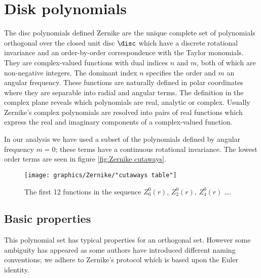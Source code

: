 \section{Disk polynomials}

The disc polynomials defined Zernike are the unique complete set of polynomials orthogonal over the closed unit disc $\disc$ which have a discrete rotational invariance and an order-by-order correspondence with the Taylor monomials. They are complex-valued functions with dual indices $n$ and $m$, both of which are non-negative integers. The dominant index $n$ specifies the order and $m$ an angular frequency. These functions are naturally defined in polar coordinates where they are separable into radial and angular terms. The definition in the complex plane reveals which polynomials are real, analytic or complex. Usually Zernike's complex polynomials are resolved into pairs of real functions which express the real and imaginary components of a complex-valued function.

In our analysis we have used a subset of the polynomials defined by angular frequency $m=0$; these terms have a continuous rotational invariance. The lowest order terms are seen in figure \eqref{fig:Zernike cutaways}.

\begin{figure}[htbp] %
   \centering
   \texttt{[image: graphics/Zernike/"cutaways table"]} 
   \caption{The first 12 functions in the sequence $Z_{0}^{0}(r)$, $Z_{2}^{0}(r)$, $Z_{4}^{0}(r)$ \dots .}
   \label{fig:Zernike cutaways}
\end{figure}

\subsection{Basic properties}
This polynomial set has typical properties for an orthogonal set. However some ambiguity has appeared as some authors have introduced different naming conventions; we adhere to Zernike's protocol which is based upon the Euler identity.
 
